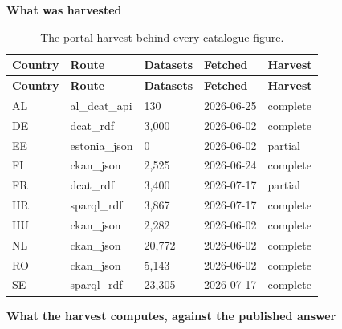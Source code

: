\textbf{What was harvested}

{\footnotesize
\begin{longtable}[]{@{}
  L{0.1181}
  L{0.1869}
  L{0.1476}
  L{0.1574}
  L{0.1574}@{}}
\caption{The portal harvest behind every catalogue figure.}\label{tab:harvest-register}\\
\toprule\noalign{}
\textbf{Country} & \textbf{Route} & \textbf{Datasets} & \textbf{Fetched} & \textbf{Harvest} \\
\midrule\noalign{}
\endfirsthead
\toprule\noalign{}
\textbf{Country} & \textbf{Route} & \textbf{Datasets} & \textbf{Fetched} & \textbf{Harvest} \\
\midrule\noalign{}
\endhead
\bottomrule\noalign{}
\endlastfoot
AL & al\_\allowbreak dcat\_\allowbreak api & 130 & 2026-06-25 & complete \\
DE & dcat\_\allowbreak rdf & 3,000 & 2026-06-02 & complete \\
EE & estonia\_\allowbreak json & 0 & 2026-06-02 & partial \\
FI & ckan\_\allowbreak json & 2,525 & 2026-06-24 & complete \\
FR & dcat\_\allowbreak rdf & 3,400 & 2026-07-17 & partial \\
HR & sparql\_\allowbreak rdf & 3,867 & 2026-07-17 & complete \\
HU & ckan\_\allowbreak json & 2,282 & 2026-06-02 & complete \\
NL & ckan\_\allowbreak json & 20,772 & 2026-06-02 & complete \\
RO & ckan\_\allowbreak json & 5,143 & 2026-06-02 & complete \\
SE & sparql\_\allowbreak rdf & 23,305 & 2026-07-17 & complete \\
\end{longtable}
}


\textbf{What the harvest computes, against the published answer}

